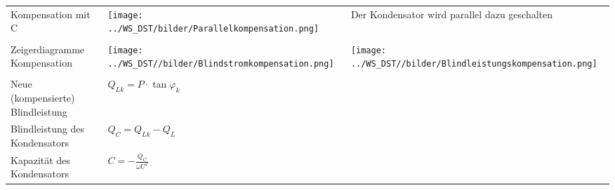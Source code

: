 
\begin{tabular}{p{7cm}p{4.5cm}p{5cm}}
	Kompensation mit C &
    	\begin{minipage}{4cm}
        	\texttt{[image: ../WS\_DST/bilder/Parallelkompensation.png]}
        \end{minipage} & 
		Der Kondensator wird parallel dazu geschalten \\ \\
	Zeigerdiagramme Kompensation &
		\begin{minipage}{4.5cm}
        	\texttt{[image: ../WS\_DST//bilder/Blindstromkompensation.png]}
        \end{minipage} &
		\begin{minipage}{4.5cm}
        	\texttt{[image: ../WS\_DST//bilder/Blindleistungskompensation.png]}
        \end{minipage} \\ \\
	Neue (kompensierte) Blindleistung &
		$Q_{Lk} = P \cdot \tan{\varphi_k}$ \\
	Blindleistung des Kondensators &
		$Q_C = Q_{Lk} - Q_L$ \\
	Kapazit\"at des Kondensators &
		$C = -\frac{Q_C}{\omega U^2}$ \\	
	\end{tabular}